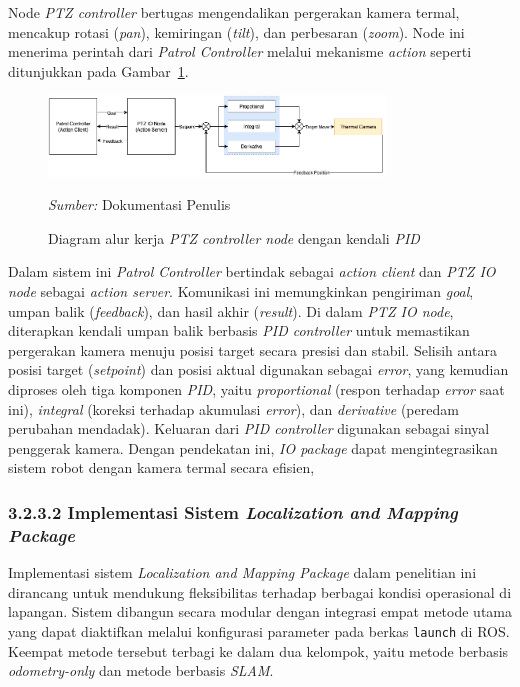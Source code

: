 Node \emph{PTZ controller} bertugas mengendalikan pergerakan kamera termal, mencakup rotasi (\emph{pan}), kemiringan (\emph{tilt}), dan perbesaran (\emph{zoom}). Node ini menerima perintah dari \emph{Patrol Controller} melalui mekanisme \emph{action}  seperti ditunjukkan pada Gambar~\ref{fig:ptz-control}.

\begin{figure}[H]
  \centering
  \includegraphics[width=0.8\textwidth]{gambar/bab3/ptz-control.png}
  \caption{Diagram alur kerja \emph{PTZ controller node} dengan kendali \emph{PID}}
  \label{fig:ptz-control}
  \footnotesize{\emph{Sumber:} Dokumentasi Penulis}
\end{figure}

Dalam sistem ini \emph{Patrol Controller} bertindak sebagai \emph{action client} dan \emph{PTZ IO node} sebagai \emph{action server}. Komunikasi ini memungkinkan pengiriman \emph{goal}, umpan balik (\emph{feedback}), dan hasil akhir (\emph{result}). Di dalam \emph{PTZ IO node}, diterapkan kendali umpan balik berbasis \emph{PID controller} untuk memastikan pergerakan kamera menuju posisi target secara presisi dan stabil. Selisih antara posisi target (\emph{setpoint}) dan posisi aktual digunakan sebagai \emph{error}, yang kemudian diproses oleh tiga komponen \emph{PID}, yaitu \emph{proportional} (respon terhadap \emph{error} saat ini), \emph{integral} (koreksi terhadap akumulasi \emph{error}), dan \emph{derivative} (peredam perubahan mendadak). Keluaran dari \emph{PID controller} digunakan sebagai sinyal penggerak kamera. Dengan pendekatan ini, \emph{IO package} dapat mengintegrasikan sistem robot dengan kamera termal secara efisien,

\subsubsection{3.2.3.2 Implementasi Sistem \emph{Localization and Mapping Package}}

Implementasi sistem \emph{Localization and Mapping Package} dalam penelitian ini dirancang untuk mendukung fleksibilitas terhadap berbagai kondisi operasional di lapangan. Sistem dibangun secara modular dengan integrasi empat metode utama yang dapat diaktifkan melalui konfigurasi parameter pada berkas \texttt{launch} di ROS. Keempat metode tersebut terbagi ke dalam dua kelompok, yaitu metode berbasis \emph{odometry-only} dan metode berbasis \emph{SLAM}.

